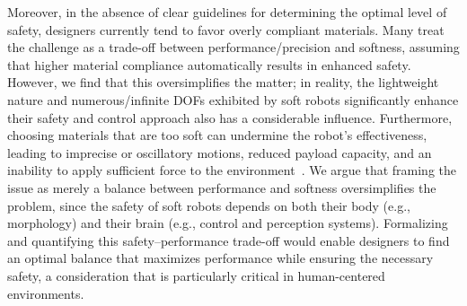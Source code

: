Moreover, in the absence of clear guidelines for determining the optimal level of safety, designers currently tend to favor overly compliant materials. Many treat the challenge as a trade-off between performance/precision and softness, assuming that higher material compliance automatically results in enhanced safety. 
However, we find that this oversimplifies the matter; in reality, the lightweight nature and numerous/infinite \glspl{DOF} exhibited by soft robots significantly enhance their safety and control approach also has a considerable influence.
Furthermore, choosing materials that are too soft can undermine the robot’s effectiveness, leading to imprecise or oscillatory motions, reduced payload capacity, and an inability to apply sufficient force to the environment~\citep{iida2011soft, cianchetti2013stiff, mazzolai2022roadmap, majidi2014soft, hawkes2017soft}. We argue that framing the issue as merely a balance between performance and softness oversimplifies the problem, since the safety of soft robots depends on both their body (e.g., morphology) and their brain (e.g., control and perception systems). Formalizing and quantifying this safety–performance trade-off would enable designers to find an optimal balance that maximizes performance while ensuring the necessary safety, a consideration that is particularly critical in human-centered environments.

